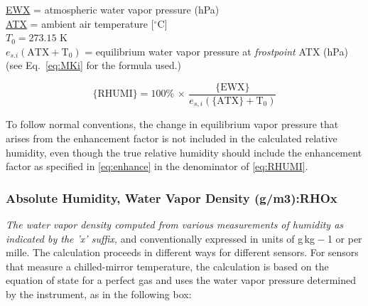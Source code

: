 \documentclass[
]{book}
\begin{document}
\protect\hyperlink{ewx}{EWX} = atmospheric water vapor pressure (hPa)\\
\protect\hyperlink{ambient-t}{ATX} = ambient air temperature {[}\(^{\circ}\mathrm{C}\){]}\\
\(T_{0}=273.15\) K\\
\(e_{s.i}(\mathrm{ATX+T_{0}})\) = equilibrium water vapor pressure
at \emph{frostpoint} ATX (hPa)\\
\hspace*{0.333em}\hspace*{0.333em}\hspace*{0.333em}\hspace*{0.333em}\hspace*{0.333em}\hspace*{0.333em}\hspace*{0.333em}\hspace*{0.333em}\hspace*{0.333em}\hspace*{0.333em}(see Eq.~\eqref{eq:MKi} for the formula
used.)

\begin{equation}
\mathrm{\{RHUMI\}}=100\%\,\times\,\frac{\mathrm{\{EWX\}}}{e_{s,i}(\mathrm{\{ATX\}+T_{0}})}
\label{eq:RHUMI}
\end{equation}

To follow normal conventions, the change in equilibrium vapor pressure that arises from the enhancement factor is not included in the calculated relative humidity, even though the true relative humidity should include the enhancement factor as specified in \eqref{eq:enhance} in the denominator of \eqref{eq:RHUMI}.

\hypertarget{rho}{%
\subsubsection*{\texorpdfstring{Absolute Humidity, Water Vapor Density (g/m{3}):RHOx}{Absolute Humidity, Water Vapor Density (g/m3):RHOx}}\label{rho}}

\emph{The water vapor density computed from various measurements of humidity as indicated by the 'x' suffix,} and conventionally expressed in units of g kg{ − 1} or per mille. The calculation proceeds in different ways for different sensors. For sensors that measure a chilled-mirror temperature, the calculation is based on the equation of state for a perfect gas and uses the water vapor pressure determined by the instrument, as in the following box:
\end{document}
